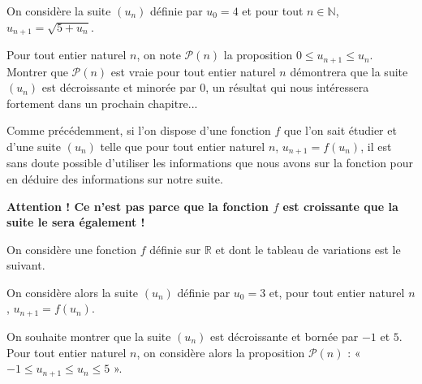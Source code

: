 \documentclass[11pt,fleqn]{book} %
\begin{document}
\begin{example}On considère la suite $(u_n)$ définie par $u_0=4$ et pour tout $n\in\mathbb{N}$, $u_{n+1}=\sqrt{5+u_n}$.

Pour tout entier naturel $n$, on note $\mathcal{P}(n)$ la proposition $0\leqslant u_{n+1} \leqslant u_n$. Montrer que $\mathcal{P}(n)$ est vraie pour tout entier naturel $n$ démontrera que la suite $(u_n)$ est décroissante et minorée par 0, un résultat qui nous intéressera fortement dans un prochain chapitre...
\vskip250pt
\end{example}
\newpage
Comme précédemment, si l'on dispose d'une fonction $f$ que l'on sait étudier et d'une suite $(u_n)$ telle que pour tout entier naturel $n$, $u_{n+1}=f(u_n)$, il est sans doute possible d'utiliser les informations que nous avons sur la fonction pour en déduire des informations sur notre suite.

\textbf{Attention ! Ce n'est pas parce que la fonction $f$ est croissante que la suite le sera également !}


\begin{example}On considère une fonction $f$ définie sur $\mathbb{R}$ et dont le tableau de variations est le suivant.

\begin{center}
\end{center}

On considère alors la suite $(u_n)$ définie par $u_0=3$ et, pour tout entier naturel $n$, $u_{n+1}=f(u_n)$. 

On souhaite montrer que la suite $(u_n)$ est décroissante et bornée par $-1$ et $5$. Pour tout entier naturel $n$, on considère alors la proposition $\mathcal{P}(n)$ : « $-1 \leqslant u_{n+1} \leqslant u_n \leqslant 5$ ».
\vskip250pt

\end{example}
\end{document}
